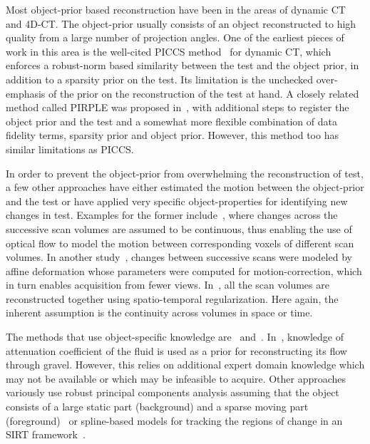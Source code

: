 \documentclass[journal]{IEEEtran}
\begin{document}
Most object-prior based reconstruction have been in the areas of
dynamic CT and 4D-CT. %
The object-prior usually consists of an object reconstructed to high
quality from a large number of projection angles. One of the earliest
pieces of work in this area is the well-cited PICCS
method~\cite{PICCS} for dynamic CT, which enforces a robust-norm based
similarity between the test and the object prior, in addition to a
sparsity prior on the test. Its limitation is the unchecked
over-emphasis of the prior on the reconstruction of the test at
hand. A closely related method called PIRPLE was proposed
in~\cite{pirple}, with additional steps to register the object prior
and the test and a somewhat more flexible combination of data fidelity
terms, sparsity prior and object prior. However, this method too has
similar limitations as PICCS.

In order to prevent the object-prior from overwhelming the
reconstruction of test, a few other approaches have either estimated
the motion between the object-prior and the test or have applied very
specific object-properties for identifying new changes in test.
Examples for the former include~\cite{koen2020}, where changes across
the successive scan volumes are assumed to be continuous, thus
enabling the use of optical flow to model the motion between
corresponding voxels of different scan volumes. In another
study~\cite{vincent2017}, changes between successive scans were
modeled by affine deformation whose parameters were computed for
motion-correction, which in turn enables acquisition from fewer
views. In~\cite{daniil2015}, all the scan volumes are reconstructed
together using spatio-temporal regularization. Here again, the
inherent assumption is the continuity across volumes in space or time.

The methods that use object-specific knowledge are~\cite{Van2015}
and~\cite{Marjolein2016}.  In~\cite{Van2015}, knowledge of attenuation
coefficient of the fluid is used as a prior for reconstructing its
flow through gravel. However, this relies on additional expert domain
knowledge which may not be available or which may be infeasible to
acquire. Other approaches variously use robust principal components
analysis assuming that the object consists of a large static part
(background) and a sparse moving part (foreground)~\cite{HaoGao} or
spline-based models for tracking the regions of change in an SIRT
framework~\cite{Van2014}.
\end{document}
